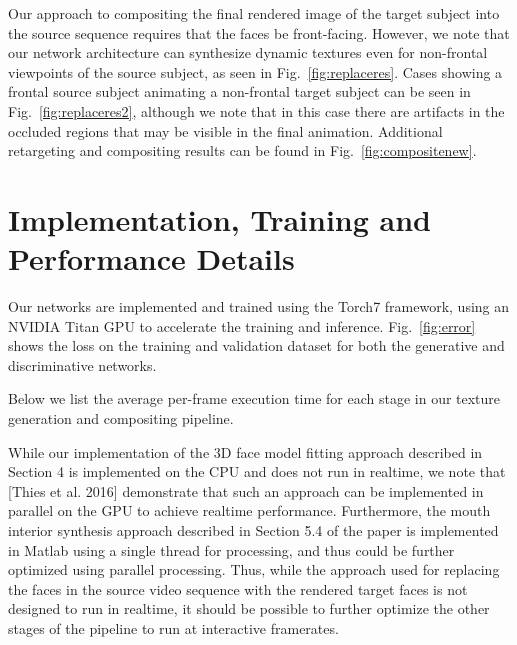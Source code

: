 \documentclass[10pt,twocolumn,letterpaper]{article}
\begin{document}
Our approach to compositing the final rendered image of the target subject into the source sequence requires that the faces be front-facing. However, we note that our network architecture can synthesize dynamic textures even for non-frontal viewpoints of the source subject, as seen in Fig.~\ref{fig:replaceres}. Cases showing a frontal source subject animating a non-frontal target subject can be seen in Fig.~\ref{fig:replaceres2}, although we note that in this case there are artifacts in the occluded regions that may be visible in the final animation. Additional retargeting and compositing results can be found in Fig.~\ref{fig:compositenew}.


\section{Implementation, Training and Performance Details}

Our networks are implemented and trained using the Torch7 framework, using an NVIDIA Titan GPU to accelerate the training and inference. Fig.~\ref{fig:error} shows the loss on the training and validation dataset for both the generative and discriminative networks.

Below we list the average per-frame execution time for each stage in our texture generation and compositing pipeline.

While our implementation of the 3D face model fitting approach described in Section 4 is implemented on the CPU and does not run in realtime, we note that [Thies et al. 2016] demonstrate that such an approach can be implemented in parallel on the GPU to achieve realtime performance. Furthermore, the mouth interior synthesis approach described in Section 5.4 of the paper is implemented in Matlab using a single thread for processing, and thus could be further optimized using parallel processing. Thus, while the approach used for replacing the faces in the source video sequence with the rendered target faces is not designed to run in realtime, it should be possible to further optimize the other stages of the pipeline to run at interactive framerates.


\end{document}
